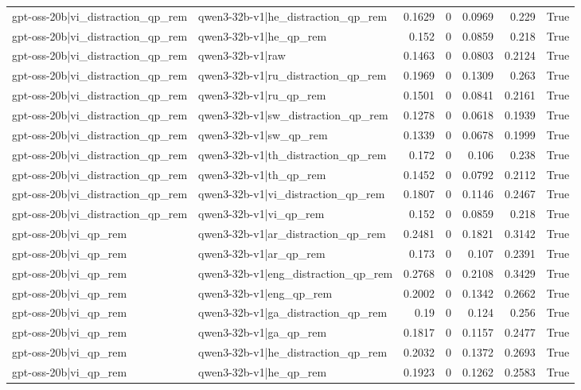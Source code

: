 \begin{table}
\begin{tabular}{l l r r r r l}
gpt-oss-20b|vi_distraction_qp_rem & qwen3-32b-v1|he_distraction_qp_rem & 0.1629 & 0 & 0.0969 & 0.229 & True \\
gpt-oss-20b|vi_distraction_qp_rem & qwen3-32b-v1|he_qp_rem & 0.152 & 0 & 0.0859 & 0.218 & True \\
gpt-oss-20b|vi_distraction_qp_rem & qwen3-32b-v1|raw & 0.1463 & 0 & 0.0803 & 0.2124 & True \\
gpt-oss-20b|vi_distraction_qp_rem & qwen3-32b-v1|ru_distraction_qp_rem & 0.1969 & 0 & 0.1309 & 0.263 & True \\
gpt-oss-20b|vi_distraction_qp_rem & qwen3-32b-v1|ru_qp_rem & 0.1501 & 0 & 0.0841 & 0.2161 & True \\
gpt-oss-20b|vi_distraction_qp_rem & qwen3-32b-v1|sw_distraction_qp_rem & 0.1278 & 0 & 0.0618 & 0.1939 & True \\
gpt-oss-20b|vi_distraction_qp_rem & qwen3-32b-v1|sw_qp_rem & 0.1339 & 0 & 0.0678 & 0.1999 & True \\
gpt-oss-20b|vi_distraction_qp_rem & qwen3-32b-v1|th_distraction_qp_rem & 0.172 & 0 & 0.106 & 0.238 & True \\
gpt-oss-20b|vi_distraction_qp_rem & qwen3-32b-v1|th_qp_rem & 0.1452 & 0 & 0.0792 & 0.2112 & True \\
gpt-oss-20b|vi_distraction_qp_rem & qwen3-32b-v1|vi_distraction_qp_rem & 0.1807 & 0 & 0.1146 & 0.2467 & True \\
gpt-oss-20b|vi_distraction_qp_rem & qwen3-32b-v1|vi_qp_rem & 0.152 & 0 & 0.0859 & 0.218 & True \\
gpt-oss-20b|vi_qp_rem & qwen3-32b-v1|ar_distraction_qp_rem & 0.2481 & 0 & 0.1821 & 0.3142 & True \\
gpt-oss-20b|vi_qp_rem & qwen3-32b-v1|ar_qp_rem & 0.173 & 0 & 0.107 & 0.2391 & True \\
gpt-oss-20b|vi_qp_rem & qwen3-32b-v1|eng_distraction_qp_rem & 0.2768 & 0 & 0.2108 & 0.3429 & True \\
gpt-oss-20b|vi_qp_rem & qwen3-32b-v1|eng_qp_rem & 0.2002 & 0 & 0.1342 & 0.2662 & True \\
gpt-oss-20b|vi_qp_rem & qwen3-32b-v1|ga_distraction_qp_rem & 0.19 & 0 & 0.124 & 0.256 & True \\
gpt-oss-20b|vi_qp_rem & qwen3-32b-v1|ga_qp_rem & 0.1817 & 0 & 0.1157 & 0.2477 & True \\
gpt-oss-20b|vi_qp_rem & qwen3-32b-v1|he_distraction_qp_rem & 0.2032 & 0 & 0.1372 & 0.2693 & True \\
gpt-oss-20b|vi_qp_rem & qwen3-32b-v1|he_qp_rem & 0.1923 & 0 & 0.1262 & 0.2583 & True \\

\end{tabular}
\end{table}

